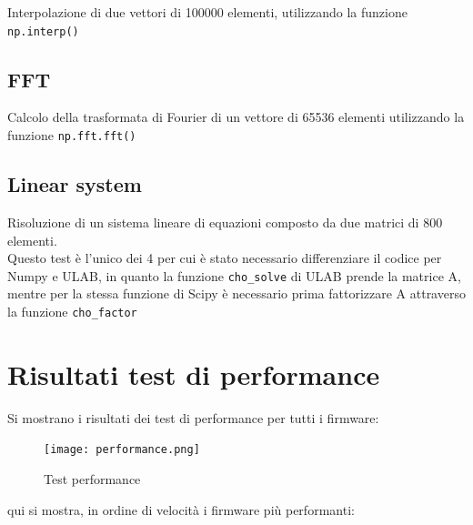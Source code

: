 \documentclass[12pt,a4paper]{report}
\begin{document}
Interpolazione di due vettori di 100000 elementi, utilizzando la
funzione \texttt{np.interp()}

\subsection{FFT}\label{fft}

Calcolo della trasformata di Fourier di un vettore di 65536 elementi
utilizzando la funzione \texttt{np.fft.fft()}

\subsection{Linear system}\label{linear-system}

Risoluzione di un sistema lineare di equazioni composto da due matrici
di 800 elementi.\\
Questo test è l'unico dei 4 per cui è stato necessario
differenziare il codice per Numpy e ULAB, in quanto la funzione
\texttt{cho\_solve} di ULAB prende la matrice A, mentre per la stessa
funzione di Scipy è necessario prima fattorizzare A attraverso la
funzione \texttt{cho\_factor}

\section{Risultati test di performance}\label{risultati-test-di-performance}

Si mostrano i risultati dei test di performance per tutti i firmware: \\

\begin{figure}[h!]
    \centering
    \texttt{[image: performance.png]}
    \caption{Test performance}
\end{figure}

qui si mostra, in ordine di velocità i firmware più performanti:
\end{document}
